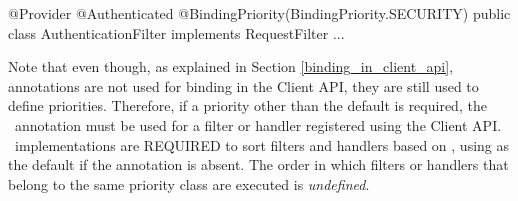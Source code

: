 \begin{listing}{1}
@Provider
@Authenticated
@BindingPriority(BindingPriority.SECURITY)
public class AuthenticationFilter implements RequestFilter {
    ...
}
\end{listing}

Note that even though, as explained in Section \ref{binding_in_client_api}, annotations are not used for binding in the Client API, they are still used to define priorities. Therefore, if a priority other than the default is required, the \BindingPriority\ annotation must be used for a filter or handler registered using the Client API. \jaxrs\ implementations are REQUIRED to sort filters and handlers based on , using  as the default if the annotation is absent. The order in which filters or handlers that belong to the same priority class are executed is \emph{undefined}.



